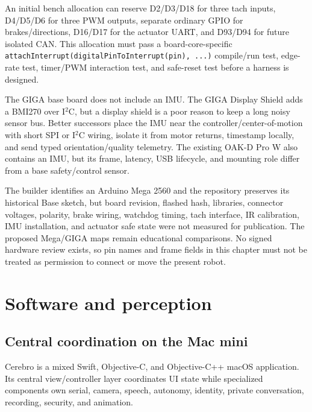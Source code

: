 \documentclass[10pt,openany]{book}
\begin{document}
An initial bench allocation can reserve D2/D3/D18 for three tach inputs, D4/D5/D6 for three PWM outputs, separate ordinary GPIO for brakes/directions, D16/D17 for the actuator UART, and D93/D94 for future isolated CAN. This allocation must pass a board-core-specific \texttt{attachInterrupt(digitalPinToInterrupt(pin), ...)} compile/run test, edge-rate test, timer/PWM interaction test, and safe-reset test before a harness is designed.

The GIGA base board does not include an IMU. The GIGA Display Shield adds a BMI270 over I$^2$C, but a display shield is a poor reason to keep a long noisy sensor bus. Better successors place the IMU near the controller/center-of-motion with short SPI or I$^2$C wiring, isolate it from motor returns, timestamp locally, and send typed orientation/quality telemetry. The existing OAK-D Pro W also contains an IMU, but its frame, latency, USB lifecycle, and mounting role differ from a base safety/control sensor.

\begin{fieldnotebox}[title={SOURCE RECORD, NOT A VERIFIED HARNESS}]
The builder identifies an Arduino Mega 2560 and the repository preserves its historical Base sketch, but board revision, flashed hash, libraries, connector voltages, polarity, brake wiring, watchdog timing, tach interface, IR calibration, IMU installation, and actuator safe state were not measured for publication. The proposed Mega/GIGA maps remain educational comparisons. No signed hardware review exists, so pin names and frame fields in this chapter must not be treated as permission to connect or move the present robot.
\end{fieldnotebox}

\part{Software and perception}


\chapter{Central coordination on the Mac mini}

Cerebro is a mixed Swift, Objective-C, and Objective-C++ macOS application. Its central view/controller layer coordinates UI state while specialized components own serial, camera, speech, autonomy, identity, private conversation, recording, security, and animation.
\end{document}
